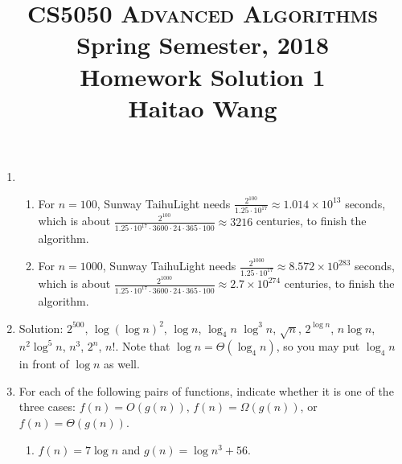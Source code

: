 \documentclass[11pt]{article}
\begin{document}
\baselineskip=14.0pt

\title{CS5050 \textsc{Advanced Algorithms}
\\{\large Spring Semester, 2018}
\\ Homework Solution 1
\\ {\large Haitao Wang}}
\date{}


\maketitle

\vspace{-0.7in}

\begin{enumerate}

\item

\begin{enumerate}
\item
For $n=100$,
Sunway TaihuLight needs $\frac{2^{100}}{1.25\cdot 10^{17}}\approx 1.014\times 10^{13}$ seconds, which is about $\frac{2^{100}}{1.25\cdot 10^{17} \cdot 3600\cdot 24\cdot 365\cdot 100}\approx 3216$ centuries, to finish the algorithm.


\item
For $n=1000$,
Sunway TaihuLight needs $\frac{2^{1000}}{1.25\cdot 10^{17}}\approx 8.572\times 10^{283}$ seconds, which is about $\frac{2^{1000}}{1.25\cdot 10^{17} \cdot 3600\cdot 24\cdot 365\cdot 100}\approx 2.7\times 10^{274}$ centuries, to finish the algorithm.

\end{enumerate}



\item

Solution: $2^{500}$, $\log(\log n)^2$, $\log n$, $\log_4 n$ $\log^3 n$, $\sqrt{n}$, $2^{\log n}$, $n\log n$, $n^2\log^5 n$, $n^3$, $2^n$, $n!$. Note that $\log n = \Theta(\log_4 n)$, so you may put $\log_4 n$ in front of $\log n$ as well.


\item
For each of the following pairs of functions, indicate
whether it is one of the three cases: $f(n)=O(g(n))$, $f(n)=\Omega(g(n))$, or $f(n)=\Theta(g(n))$.

\begin{enumerate}
\item $f(n)=7\log n$ and $g(n)=\log n^3 + 56$.


\end{enumerate}
\end{enumerate}
\end{document}
